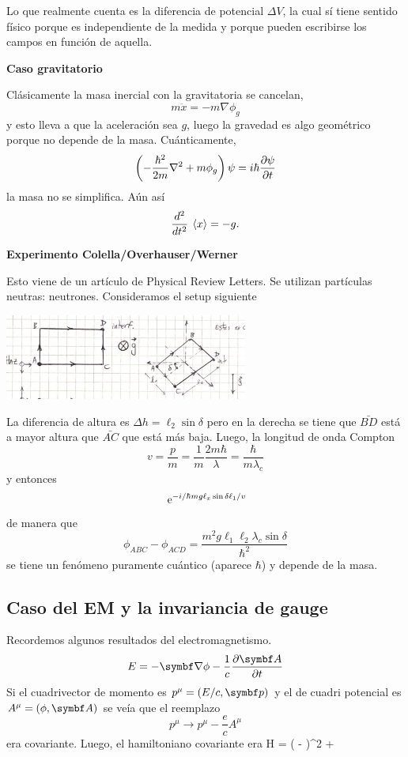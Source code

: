 \documentclass[10pt,oneside]{CBFT_book}
\begin{document}
Lo que realmente cuenta es la diferencia de potencial $\Delta V$, la cual sí tiene sentido físico porque es 
independiente de la medida y porque pueden escribirse los campos en función de aquella.

\begin{ejemplo}{\bf Caso gravitatorio}
 
Clásicamente la masa inercial con la gravitatoria se cancelan,
\[
	m \ddot{x} = - m \nabla \phi_g
\]
y esto lleva a que la aceleración sea $g$, luego la gravedad es algo geométrico porque no depende de la masa.
Cuánticamente,
\[
	\left( -\frac{\hbar^2}{2m}\nabla^2 + m \phi_g \right) \psi = i \hbar \dpar{\psi}{t}
\]
la masa no se simplifica. Aún así 
\[
	\dtot[2]{}{t} \vm{x} = - g.
\]

 
\end{ejemplo}


\begin{ejemplo}{\bf Experimento Colella/Overhauser/Werner}

Esto viene de un artículo de Physical Review Letters.
Se utilizan partículas neutras: neutrones.
Consideramos el setup siguiente
 
\includegraphics[width=0.6\textwidth]{images/fig_ft2_colella.jpg} 

La diferencia de altura es $\Delta h = \ell_2 \sin \delta $ pero en la derecha se tiene que
$\bar{BD}$ está a mayor altura que $\bar{AC}$ que está más baja.
Luego, la longitud de onda Compton
\[
	v = \frac{p}{m} = \frac{1}{m} \frac{2m\hbar}{\lambda} = \frac{\hbar}{m\lambda_c}
\]
y entonces
\[
	\euler^{ - i/\hbar m g \ell_x \sin \delta \ell_1/v }
\]
de manera que
\[
	\phi_{ABC} - \phi_{ACD} = \frac{ m^2 g \ell_1 \ell_2 \lambda_c \sin \delta }{\hbar^2}
\]
se tiene un fenómeno puramente cuántico (aparece $\hbar$) y depende de la masa.
  
\end{ejemplo}

\subsection{Caso del EM y la invariancia de gauge}

Recordemos algunos resultados del electromagnetismo.
\[
	E = - \Nabla\phi - \frac{1}{c}\dpar{\vb{A}}{t}
\]
Si el cuadrivector de momento es $p^\mu = (E/c, \vb p)$ y el de cuadri potencial es $A^\mu =(\phi,\vb A)$
se veía que el reemplazo
\[
	p^\mu \to p^\mu - \frac{e}{c} A^\mu
\]
era covariante.
Luego, el hamiltoniano covariante era
\be
	H =  \left(  - \right)^2 + \euler \phi 
	\label{ham_cov_em}
\ee
\end{document}
